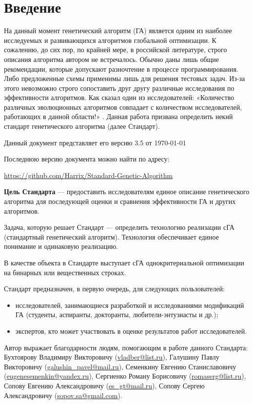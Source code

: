 \chapter*{Введение}
На данный момент генетический алгоритм (ГА) является одним из наиболее исследуемых и развивающихся алгоритмов глобальной оптимизации. К сожалению, до сих пор, по крайней мере, в российской литературе, строго описания алгоритма автором не встречалось. Обычно даны лишь общие рекомендации, которые допускают разночтение в процессе программирования. Либо предложенные схемы применимы лишь для решения тестовых задач. Из-за этого невозможно строго сопоставить друг другу различные исследования по эффективности алгоритмов. Как сказал один из исследователей: «Количество различных эволюционных алгоритмов совпадает с количеством исследователей, работающих в данной области!» \cite{web:makeingsimpleGA}. Данная работа призвана определить некий стандарт генетического алгоритма (далее Стандарт).

Данный документ представляет его версию 3.5 от \today

Последнюю версию документа можно найти по адресу:

\href{https://github.com/Harrix/Standard-Genetic-Algorithm}{https://github.com/Harrix/Standard-Genetic-Algorithm}

\textbf{Цель Стандарта} --- предоставить исследователям единое описание генетического алгоритма для последующей оценки и сравнения эффективности ГА и других алгоритмов. 

Задача, которую решает Стандарт --- определить технологию реализации сГА (стандартный генетический алгоритм). Технология обеспечивает единое понимание и одинаковую реализацию.

В качестве объекта в Стандарте выступает сГА однокритериальной оптимизации на бинарных или вещественных строках.

Стандарт предназначен, в первую очередь, для следующих пользователей:
\begin{itemize}
\item исследователей, занимающиеся  разработкой и исследованиями модификаций ГА (студенты, аспиранты, докторанты, любители-энтузиасты и др.);
\item экспертов, кто может участвовать в оценке результатов работ исследователей.
\end{itemize}


Автор выражает благодарности людям, помогающим в работе данного Стандарта: Бухтоярову Владимиру Викторовичу (\href{mailto:vladber@list.ru}{vladber@list.ru}), Галушину Павлу Викторовичу (\href{mailto:galushin\_pavel@mail.ru}{galushin\_pavel@mail.ru}), Семенкину Евгению Станиславовичу (\href{mailto:eugenesemenkin@yandex.ru}{eugenesemenkin@yandex.ru}), Сергиенко Роману Борисовичу (\href{mailto:romaserg@list.ru}{romaserg@list.ru}), Сопову Евгению Александровичу (\href{mailto:es\_gt@mail.ru}{es\_gt@mail.ru}), Сопову Сергею Александровичу (\href{mailto:sopov.sa@gmail.com}{sopov.sa@gmail.com}).

